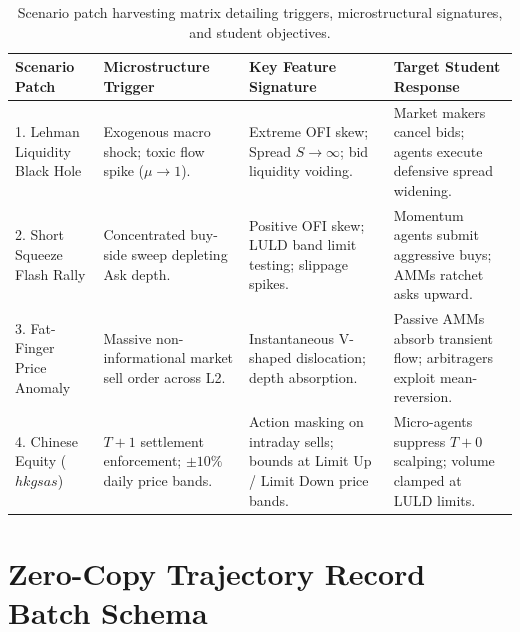 \begin{table}[htbp]
\centering
\small
\begin{tabularx}{\textwidth}{p{3.2cm} p{3.2cm} p{3.6cm} X}
\toprule
\textbf{Scenario Patch} & \textbf{Microstructure Trigger} & \textbf{Key Feature Signature} & \textbf{Target Student Response} \\
\midrule
1. Lehman Liquidity Black Hole & Exogenous macro shock; toxic flow spike ($\mu \to 1$). & Extreme OFI skew; Spread $S \to \infty$; bid liquidity voiding. & Market makers cancel bids; agents execute defensive spread widening. \\
2. Short Squeeze Flash Rally & Concentrated buy-side sweep depleting Ask depth. & Positive OFI skew; LULD band limit testing; slippage spikes. & Momentum agents submit aggressive buys; AMMs ratchet asks upward. \\
3. Fat-Finger Price Anomaly & Massive non-informational market sell order across L2. & Instantaneous V-shaped dislocation; depth absorption. & Passive AMMs absorb transient flow; arbitragers exploit mean-reversion. \\
4. Chinese Equity ($hkgsas$) & $T+1$ settlement enforcement; $\pm 10\%$ daily price bands. & Action masking on intraday sells; bounds at Limit Up / Limit Down price bands. & Micro-agents suppress $T+0$ scalping; volume clamped at LULD limits. \\
\bottomrule
\end{tabularx}
\caption{Scenario patch harvesting matrix detailing triggers, microstructural signatures, and student objectives.}
\label{tab:scenario_patch_matrix}
\end{table}

\section{Zero-Copy Trajectory Record Batch Schema}

